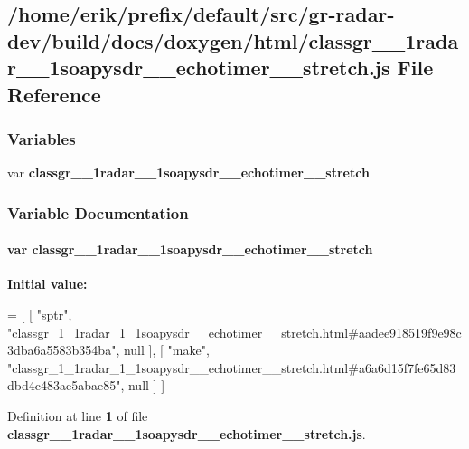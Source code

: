 \subsection{/home/erik/prefix/default/src/gr-\/radar-\/dev/build/docs/doxygen/html/classgr\+\_\+\_\+1radar\+\_\+\_\+1soapysdr\+\_\+\+\_\+echotimer\+\_\+\+\_\+stretch.js File Reference}
\label{classgr__1__1radar__1__1soapysdr____echotimer____stretch_8js}
\subsubsection*{Variables}
\begin{DoxyCompactItemize}
\item 
var {\bf classgr\+\_\+\_\+1radar\+\_\+\_\+1soapysdr\+\_\+\+\_\+echotimer\+\_\+\+\_\+stretch}
\end{DoxyCompactItemize}


\subsubsection{Variable Documentation}
\paragraph[{classgr\+\_\+1\+\_\+1radar\+\_\+1\+\_\+1soapysdr\+\_\+\+\_\+echotimer\+\_\+\+\_\+stretch}]{\setlength{\rightskip}{0pt plus 5cm}var classgr\+\_\+\_\+1radar\+\_\+\_\+1soapysdr\+\_\+\+\_\+echotimer\+\_\+\+\_\+stretch}\label{classgr__1__1radar__1__1soapysdr____echotimer____stretch_8js_aa4f4b47f99ae66868c84b071b79e89dc}
{\bfseries Initial value\+:}
\begin{DoxyCode}
=
[
    [ \textcolor{stringliteral}{"sptr"}, \textcolor{stringliteral}{"classgr\_1\_1radar\_1\_1soapysdr\_\_echotimer\_\_stretch.html#aadee918519f9e98c3dba6a5583b354ba"}, 
      null ],
    [ \textcolor{stringliteral}{"make"}, \textcolor{stringliteral}{"classgr\_1\_1radar\_1\_1soapysdr\_\_echotimer\_\_stretch.html#a6a6d15f7fe65d83dbd4c483ae5abae85"}, 
      null ]
]
\end{DoxyCode}


Definition at line {\bf 1} of file {\bf classgr\+\_\+\_\+1radar\+\_\+\_\+1soapysdr\+\_\+\+\_\+echotimer\+\_\+\+\_\+stretch.\+js}.


